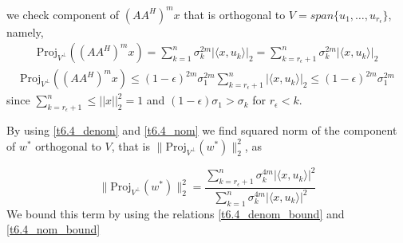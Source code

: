 \documentclass[a4paper, english, headtopline=0.08em, headsepline=0.04em, left = 1cm, right = 1cm, DIV=15]{article}
\begin{document}
we check component of $(AA^H)^m x$ that is orthogonal to $V = span\{u_1,\dots,u_{r_\epsilon}\}$, namely,
\begin{align} \label{t6.4_nom}
	\text{Proj}_{V^{\bot}}\left( \left( AA^H\right)^m x \right) = \sum_{k=1}^n \sigma_k^{2m} |\langle x, u_k \rangle|_2=\sum_{k=r_\epsilon + 1}^n \sigma_k^{2m} |\langle x, u_k \rangle|_2 
\end{align} 
\begin{align} \label{t6.4_nom_bound}
	\text{Proj}_{V^{\bot}}\left( \left( AA^H\right)^m x \right) 
	\leq (1-\epsilon)^{2m} \sigma_1^{2m} \sum_{k=r_\epsilon + 1}^n |\langle x, u_k\rangle|_2 \leq (1-\epsilon)^{2m} \sigma_1^{2m}	
\end{align}
since $\sum_{k=r_\epsilon + 1}^n \leq ||x||_2^2 = 1$ and $(1-\epsilon)\sigma_1>\sigma_k$ for $r_{\epsilon}<k$.

By using \cref{t6.4_denom} and \cref{t6.4_nom} we find squared norm of the component of $w^*$ orthogonal to $V$, that is $\|\text{Proj}_{V^{\bot }}(w^*)\|_2^2$, as


$$
\|\text{Proj}_{V^{\bot }}(w^*)\|_2^2
= \frac{\sum_{k=r_\epsilon + 1}^n \sigma_k^{4m} |\langle x, u_k \rangle|^2}{\sum_{k=1}^n \sigma_k^{4m} |\langle x, u_k \rangle|^2}
$$
We bound this term by using the relations \cref{t6.4_denom_bound} and \cref{t6.4_nom_bound}
\end{document}
